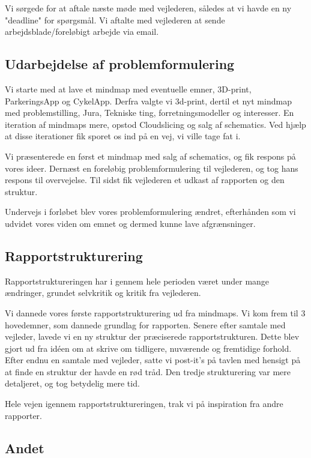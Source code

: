 Vi sørgede for at aftale næste møde med vejlederen, således at vi havde en ny "deadline" for spørgsmål. Vi aftalte med vejlederen at sende arbejdsblade/foreløbigt arbejde via email.



\subsection{Udarbejdelse af problemformulering}

Vi starte med at lave et mindmap med eventuelle emner, 3D-print, ParkeringsApp og CykelApp. Derfra valgte vi 3d-print, dertil et nyt mindmap med problemstilling, Jura, Tekniske ting, forretningsmodeller og interesser. En iteration af mindmaps mere, opstod Cloudslicing og salg af schematics. Ved hjælp at disse iterationer fik sporet os ind på en vej, vi ville tage fat i.

Vi præsenterede en først et mindmap med salg af schematics, og fik respons på vores ideer. Dernæst en foreløbig problemformulering til vejlederen, og tog hans respons til overvejelse. Til sidst fik vejlederen et udkast af rapporten og den struktur.

Undervejs i forløbet blev vores problemformulering ændret, efterhånden som vi udvidet vores viden om emnet og dermed kunne lave afgrænsninger.


\subsection{Rapportstrukturering}


Rapportstruktureringen har i gennem hele perioden været under mange ændringer, grundet selvkritik og kritik fra vejlederen.

Vi dannede vores første rapportstrukturering ud fra mindmaps. Vi kom frem til 3 hovedemner, som dannede grundlag for rapporten. Senere efter samtale med vejleder, lavede vi en ny struktur der præciserede rapportstrukturen. Dette blev gjort ud fra idéen om at skrive om tidligere, nuværende og fremtidige forhold. Efter endnu en samtale med vejleder, satte vi post-it's på tavlen med hensigt på at finde en struktur der havde en rød tråd. Den tredje strukturering var mere detaljeret, og tog betydelig mere tid.

Hele vejen igennem rapportstruktureringen, trak vi på inspiration fra andre rapporter.

\subsection{Andet}


